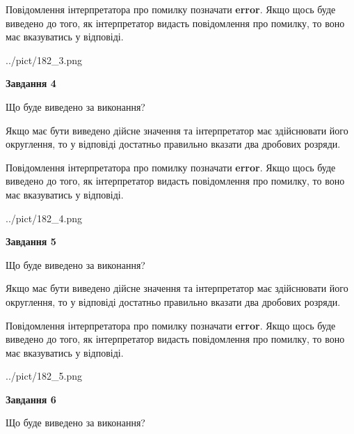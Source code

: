 \documentclass[12pt, ukrainian]{article}
\begin{document}
{\begin {Large}
Повідомлення інтерпретатора про помилку позначати \textbf{error}.
Якщо щось буде виведено до того, як інтерпретатор видасть повідомлення про помилку, 
то воно має вказуватись у відповіді. \par

\begin{center}
	{../pict/182_3.png}
\end{center}
\newpage

{\begin {center}\textbf{Завдання 4}\end {center}}\par
Що буде виведено за виконання? \par

Якщо має бути виведено дійсне значення та інтерпретатор має здійснювати його округлення, 
то у відповіді достатньо правильно вказати два дробових розряди.

Повідомлення інтерпретатора про помилку позначати \textbf{error}.
Якщо щось буде виведено до того, як інтерпретатор видасть повідомлення про помилку, 
то воно має вказуватись у відповіді. \par

\begin{center}
	{../pict/182_4.png}
\end{center}
\newpage

{\begin {center}\textbf{Завдання 5}\end {center}}\par
Що буде виведено за виконання? \par

Якщо має бути виведено дійсне значення та інтерпретатор має здійснювати його округлення, 
то у відповіді достатньо правильно вказати два дробових розряди.

Повідомлення інтерпретатора про помилку позначати \textbf{error}.
Якщо щось буде виведено до того, як інтерпретатор видасть повідомлення про помилку, 
то воно має вказуватись у відповіді. \par

\begin{center}
	{../pict/182_5.png}
\end{center}
\newpage

{\begin {center}\textbf{Завдання 6}\end {center}}\par
Що буде виведено за виконання? \par


\end{Large}}
\end{document}
